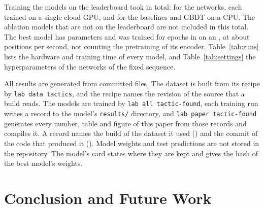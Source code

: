 \documentclass[11pt]{article}
\begin{document}
Training the  models on the leaderboard took 
in total:  for the networks, each trained on a
single cloud GPU, and  for the baselines and GBDT on a
CPU. The ablation models that are not on the leaderboard are not included in
this total. The best model has  parameters and was trained
for  epochs in  on an , at
about  positions per second, not counting the
pretraining of its encoder. Table~\ref{tab:runs} lists the hardware and
training time of every model, and Table~\ref{tab:settings} the
hyperparameters of the networks of the fixed sequence.

All results are generated from committed files. The dataset is built from
its recipe by \texttt{lab data tactics}, and the recipe names the revision of
the source that a build reads. The models are trained by
\texttt{lab all tactic-found}, each training run writes a record to the
model's \texttt{results/} directory, and \texttt{lab paper tactic-found}
generates every number, table and figure of this paper from those records
and compiles it. A record names the build of the dataset it used
() and the commit of the code that produced it
(). Model weights and test predictions are not stored in the
repository. The model's card states where they are kept and gives the hash
of the best model's weights.

\section{Conclusion and Future Work}
\label{sec:conclusion}
\end{document}
